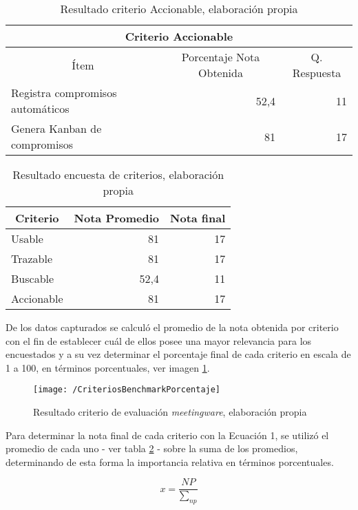 \begin{table}[!h]
\centering
\caption{Resultado criterio Accionable, elaboración propia}
\label{tab:accionable}
\begin{tabular}{|l|r|r|}
\hline
\multicolumn{3}{|c|}{Criterio Accionable} \\ \hline
\multicolumn{1}{|c|}{Ítem} & \multicolumn{1}{c|}{Porcentaje Nota Obtenida} & \multicolumn{1}{c|}{Q. Respuesta} \\ \hline
Registra compromisos automáticos & 52,4 & 11 \\ \hline
Genera Kanban de compromisos & 81 & 17 \\ \hline
\end{tabular}
\end{table}

\begin{table}[!h]
\centering
\caption{Resultado encuesta de criterios, elaboración propia}
\label{tab:resultado}
\begin{tabular}{|l|r|r|}
\hline
\multicolumn{1}{|c|}{Criterio} & \multicolumn{1}{c|}{Nota Promedio} & \multicolumn{1}{c|}{Nota final} \\ \hline
Usable & 81 & 17 \\ \hline
Trazable & 81 & 17 \\ \hline
Buscable & 52,4 & 11 \\ \hline
Accionable & 81 & 17 \\ \hline
\end{tabular}
\end{table}

De los datos capturados se calculó el promedio de la nota obtenida por criterio con el fin de establecer cuál de ellos posee una mayor relevancia para los encuestados y a su vez determinar el porcentaje final de cada criterio en escala de 1 a 100, en términos porcentuales, ver imagen \ref{img3-3}.


\begin{figure}[!h]
\centering
\texttt{[image: /CriteriosBenchmarkPorcentaje]}
\caption{Resultado criterio de evaluación \textit{meetingware}, elaboración propia} 
\label{img3-3}
\end{figure}

Para determinar la nota final de cada criterio con la Ecuación 1, se utilizó el promedio de cada uno - ver tabla \ref{tab:resultado} - sobre la suma de los promedios, determinando de esta forma la importancia relativa en términos porcentuales.

\begin{equation}
x = \frac{NP}{\sum_{np}}
\end{equation}

